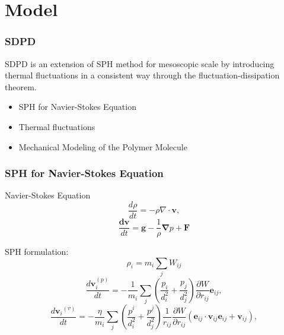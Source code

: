 \section[Model]{Model}
\begin{frame}
  \frametitle{SDPD}
   \begin{block}{}
   SDPD is an extension of SPH method for mesoscopic scale by introducing thermal fluctuations in a consistent
way through the fluctuation-dissipation theorem.
  \end{block}
 \begin{itemize}
  \item \alert{SPH for Navier-Stokes Equation}
  \item \alert{Thermal fluctuations} %
  \item \alert{Mechanical Modeling of the Polymer Molecule}%
  \end{itemize}
\end{frame}
\begin{frame}
  \frametitle{SPH for Navier-Stokes Equation}
Navier-Stokes Equation
\begin{equation}\label{equ:masscon}
 \frac{d\rho}{dt}=-\rho\nabla\cdot\mathbf{v},
\end{equation}
\begin{equation}\label{equ:momecon}
 \frac{\mathbf{dv}}{dt}=\mathbf{g}-\frac{1}{\rho}\mathbf{\nabla}p+\mathbf{F}
\end{equation}

SPH formulation:
  \begin{equation}\label{equ:rho}
 \rho_i=m_i \sum_j W_{ij}
\end{equation}
  \begin{equation}\label{equ:momeevo}
 \frac{d\mathbf{v}_{i}^{(p)}}{dt}=-\frac{1}{m_i}\sum_j\left(\frac{p_i}{d_{i}^{2}}+\frac{p_j}{d_{j}^{2}}\right)\frac{\partial W}{\partial r_{ij}}\mathbf{e}_{ij},
\end{equation}
\begin{equation}\label{equ:acceleration}
 \frac{d\mathbf{v}{_i}^{(v)}}{dt}=-\frac{\eta}{m_i}\sum_j\left(\frac{p^i}{d_{i}^{2}}+\frac{p^j}{d_{j}^{2}}\right)\frac{1}{r_{ij}}\frac{\partial W}{\partial r_{ij}}(\mathbf{e}_{ij}\cdot\mathbf{v}_{ij}\mathbf{e}_{ij}+\mathbf{v}_{ij}),
\end{equation}
\end{frame}

